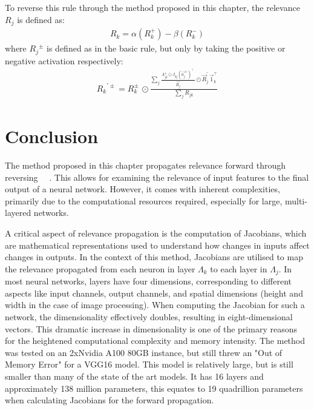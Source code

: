 To reverse this rule through the method proposed in this chapter, the relevance $R_{j}$ is defined as:
\begin{eqnarray*}
R_{k}= \alpha (R_{k}^+) - \beta(R_{k}^-)
\end{eqnarray*}
where ${R_{j}}^{\pm}$ is defined as in the basic rule, but only by taking the positive or negative activation respectively:
\begin{eqnarray*}
{R_{k}}^{\prime\pm}=  R_{k}^\pm\, \odot \frac{\sum_{j}\frac{A_{jk}^\pm \odot J_{kj}(\vec{a_j}^\pm)^\intercal\,}{ \vec{R}_{j}} \odot \vec{R}_j^\prime \, \vec{1}_k^\intercal}{\sum_{j} R_{jk}}
\end{eqnarray*}


\section{Conclusion}

The method proposed in this chapter propagates relevance forward through reversing \LRP\ ~\cite{bach2015pixel}. This allows for examining the relevance of input features to the final output of a neural network. However, it comes with inherent complexities, primarily due to the computational resources required, especially for large, multi-layered networks.

A critical aspect of relevance propagation is the computation of Jacobians, which are mathematical representations used to understand how changes in inputs affect changes in outputs. In the context of this method, Jacobians are utilised to map the relevance propagated from each neuron in layer $\Lambda_k$ to each layer in $\Lambda_j$. In most neural networks, layers have four dimensions, corresponding to different aspects like input channels, output channels, and spatial dimensions (height and width in the case of image processing). When computing the Jacobian for such a network, the dimensionality effectively doubles, resulting in eight-dimensional vectors. This dramatic increase in dimensionality is one of the primary reasons for the heightened computational complexity and memory intensity. The method was tested on an 2xNvidia A100 80GB instance, but still threw an "Out of Memory Error" for a VGG16 model. This model is relatively large, but is still smaller than many of the state of the art models. It has 16 layers and approximately 138 million parameters, this equates to 19 quadrillion parameters when calculating Jacobians for the forward propagation. 


